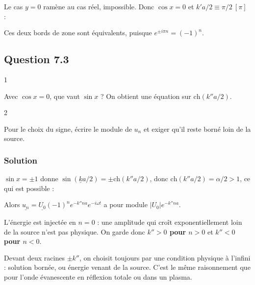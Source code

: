 \documentclass[11pt,a4paper]{article}
\newcommand{\equationajustee}[1]{%
  \sbox{\boiteequation}{$\displaystyle #1$}%
  \ifdim\wd\boiteequation>\linewidth
    \[\resizebox{\linewidth}{!}{\usebox{\boiteequation}}\]%
  \else
    \[#1\]%
  \fi}
\begin{document}
Le cas \(y=0\) ramène au cas réel, impossible. Donc \(\cos x=0\) et \(k'a/2\equiv\pi/2\ [\pi]\) :

\equationajustee{\boxed{k'=\pm\frac{\pi}{a}}}

Ces deux bords de zone sont équivalents, puisque \(e^{\pm i\pi n}=(-1)^n\).

\hypertarget{question-7.3}{%
\subsection{Question 7.3}\label{question-7.3}}

\begin{indication}{1}

Avec \(\cos x=0\), que vaut \(\sin x\) ? On obtient une équation sur \(\mathrm{ch}(k''a/2)\).

\end{indication}

\begin{indication}{2}

Pour le choix du signe, écrire le module de \(u_n\) et exiger qu'il reste borné loin de la source.

\end{indication}

\hypertarget{solution-8}{%
\subsubsection{Solution}\label{solution-8}}

\(\sin x=\pm1\) donne \(\sin(\underline ka/2)=\pm\mathrm{ch}(k''a/2)\), donc \(\mathrm{ch}(k''a/2)=\alpha/2>1\), ce qui est possible :

\equationajustee{\boxed{k''=\pm\frac2a\,\mathrm{argch}\frac\alpha2}}

Alors \(\underline{u_n}=\underline{U_0}(-1)^ne^{-k''na}e^{-i\omega t}\) a pour module \(\lvert U_0\rvert e^{-k''na}\).

L'énergie est injectée en \(n=0\) : une amplitude qui croît exponentiellement loin de la source n'est pas physique. On garde donc \textbf{\(k''>0\) pour \(n>0\)} et \textbf{\(k''<0\) pour \(n<0\)}.

\begin{methode}

Devant deux racines \(\pm k''\), on choisit toujours par une condition physique à l'infini : solution bornée, ou énergie venant de la source. C'est le même raisonnement que pour l'onde évanescente en réflexion totale ou dans un plasma.

\end{methode}
\end{document}
